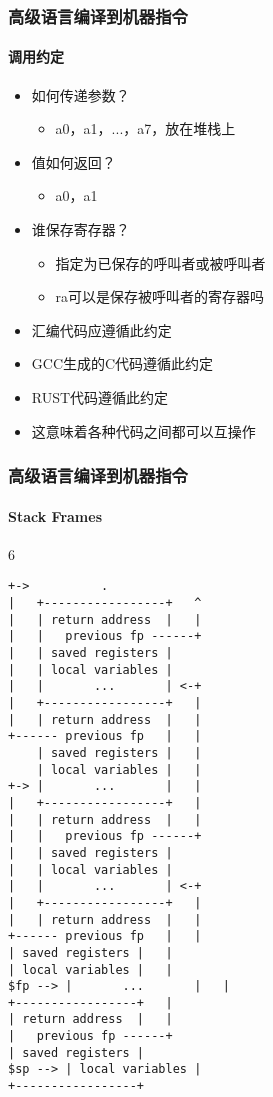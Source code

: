 \begin{frame}
	\frametitle{高级语言编译到机器指令}
\framesubtitle{调用约定}
	
 \begin{itemize}
	\item 如何传递参数？
	\begin{itemize}
	 	\item a0，a1，...，a7，放在堆栈上
	\end{itemize}
	\item 值如何返回？
	\begin{itemize}
		\item a0，a1
	\end{itemize}	
	\item 谁保存寄存器？
	\begin{itemize}
		\item 指定为已保存的呼叫者或被呼叫者
	    \item ra可以是保存被呼叫者的寄存器吗
    \end{itemize}   
	
	\item 汇编代码应遵循此约定
	\item GCC生成的C代码遵循此约定
	\item RUST代码遵循此约定
	\item 这意味着各种代码之间都可以互操作

\end{itemize} 
	
\end{frame}


\begin{frame}[fragile]
	\frametitle{高级语言编译到机器指令}
	\framesubtitle{Stack Frames}
6 
\begin{lstlisting}
+->          .
|   +-----------------+   ^
|   | return address  |   |
|   |   previous fp ------+
|   | saved registers |
|   | local variables |
|   |       ...       | <-+
|   +-----------------+   |
|   | return address  |   |
+------ previous fp   |   |
    | saved registers |   |
    | local variables |   |
+-> |       ...       |   |
|   +-----------------+   |
|   | return address  |   |
|   |   previous fp ------+
|   | saved registers |
|   | local variables |
|   |       ...       | <-+
|   +-----------------+   |
|   | return address  |   |
+------ previous fp   |   |
| saved registers |   |
| local variables |   |
$fp --> |       ...       |   |
+-----------------+   |
| return address  |   |
|   previous fp ------+
| saved registers |
$sp --> | local variables |
+-----------------+
\end{lstlisting}	
	
	
\end{frame}



